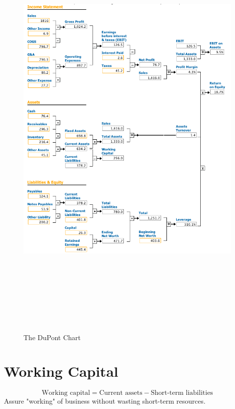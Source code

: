 \documentclass[a4paper] {scrartcl}
\begin{document}
\begin{figure}[htbp]
	\centering
		\includegraphics[height=8.6in]{dupont_chart.png}
	\caption{The DuPont Chart}
	\label{fig:dupont_chart}
\end{figure}

\section{Working Capital}
\begin{equation}
	\text{Working capital}
	= \text{Current assets} - \text{Short-term liabilities}
\end{equation}
Assure "working" of business without wasting short-term resources.
\end{document}
